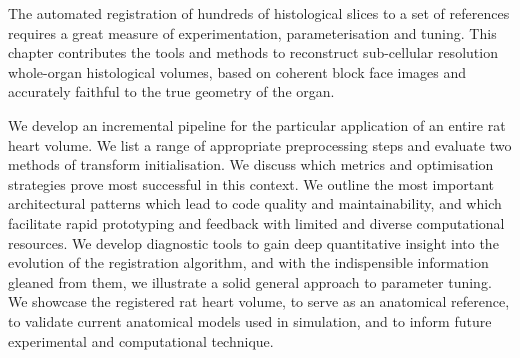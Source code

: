 The automated registration of hundreds of histological slices to a set of references requires a great measure of experimentation, parameterisation and tuning. This chapter contributes the tools and methods to reconstruct sub-cellular resolution whole-organ histological volumes, based on coherent block face images and accurately faithful to the true geometry of the organ.

We develop an incremental pipeline for the particular application of an entire rat heart volume. We list a range of appropriate preprocessing steps and evaluate two methods of transform initialisation. We discuss which metrics and optimisation strategies prove most successful in this context. We outline the most important architectural patterns which lead to code quality and maintainability, and which facilitate rapid prototyping and feedback with limited and diverse computational resources. We develop diagnostic tools to gain deep quantitative insight into the evolution of the registration algorithm, and with the indispensible information gleaned from them, we illustrate a solid general approach to parameter tuning. We showcase the registered rat heart volume, to serve as an anatomical reference, to validate current anatomical models used in simulation, and to inform future experimental and computational technique.

